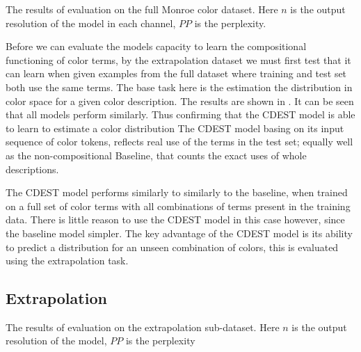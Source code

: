 \documentclass[11pt,letterpaper]{article}
\begin{document}
\begin{table}
	\centering
	\caption{\label{tblresfull} The results of evaluation on the full Monroe color dataset. Here $n$ is the output resolution of the model in each channel, $PP$ is the perplexity.}
\end{table}

Before we can evaluate the models capacity to learn the compositional functioning of color terms, by the extrapolation dataset we must first test that it can learn when given examples from the full dataset where training and test set both use the same terms.
The base task here is the estimation the distribution in color space for a given color description.
The results are shown in .
It can be seen that all models perform similarly.
Thus confirming that the CDEST model is able to learn to estimate a color distribution
The CDEST model basing on its input sequence of color tokens,
reflects real use of the terms in the test set; 
equally well as the non-compositional Baseline, that counts the exact uses of whole descriptions.

The CDEST model performs similarly to similarly to the baseline, when trained on a full set of color terms with all combinations of terms present in the training data.
There is little reason to use the CDEST model in this case however, since the baseline model simpler.
The key advantage of the CDEST model is its ability to predict a distribution for an unseen combination of colors, this is evaluated using the extrapolation task.

\subsection{Extrapolation}

\begin{table}
	\centering
	\caption{\label{tblresextrapo} The results of evaluation on the extrapolation sub-dataset. Here $n$ is the output resolution of the model, $PP$ is the perplexity}
\end{table}
\end{document}
